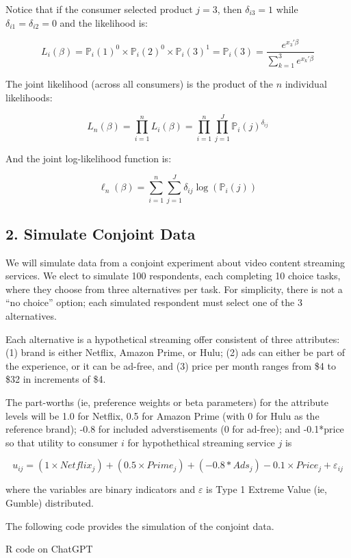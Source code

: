 \documentclass[
  letterpaper,
  DIV=11,
  numbers=noendperiod]{scrartcl}
\begin{document}
Notice that if the consumer selected product \(j=3\), then
\(\delta_{i3}=1\) while \(\delta_{i1}=\delta_{i2}=0\) and the likelihood
is:

\[ L_i(\beta) = \mathbb{P}_i(1)^0 \times \mathbb{P}_i(2)^0 \times \mathbb{P}_i(3)^1 = \mathbb{P}_i(3) = \frac{e^{x_3'\beta}}{\sum_{k=1}^3e^{x_k'\beta}} \]

The joint likelihood (across all consumers) is the product of the \(n\)
individual likelihoods:

\[ L_n(\beta) = \prod_{i=1}^n L_i(\beta) = \prod_{i=1}^n \prod_{j=1}^J \mathbb{P}_i(j)^{\delta_{ij}} \]

And the joint log-likelihood function is:

\[ \ell_n(\beta) = \sum_{i=1}^n \sum_{j=1}^J \delta_{ij} \log(\mathbb{P}_i(j)) \]

\subsection{2. Simulate Conjoint Data}\label{simulate-conjoint-data}

We will simulate data from a conjoint experiment about video content
streaming services. We elect to simulate 100 respondents, each
completing 10 choice tasks, where they choose from three alternatives
per task. For simplicity, there is not a ``no choice'' option; each
simulated respondent must select one of the 3 alternatives.

Each alternative is a hypothetical streaming offer consistent of three
attributes: (1) brand is either Netflix, Amazon Prime, or Hulu; (2) ads
can either be part of the experience, or it can be ad-free, and (3)
price per month ranges from \$4 to \$32 in increments of \$4.

The part-worths (ie, preference weights or beta parameters) for the
attribute levels will be 1.0 for Netflix, 0.5 for Amazon Prime (with 0
for Hulu as the reference brand); -0.8 for included adverstisements (0
for ad-free); and -0.1*price so that utility to consumer \(i\) for
hypothethical streaming service \(j\) is

\[
u_{ij} = (1 \times Netflix_j) + (0.5 \times Prime_j) + (-0.8*Ads_j) - 0.1\times Price_j + \varepsilon_{ij}
\]

where the variables are binary indicators and \(\varepsilon\) is Type 1
Extreme Value (ie, Gumble) distributed.

The following code provides the simulation of the conjoint data.

R code on ChatGPT
\end{document}
